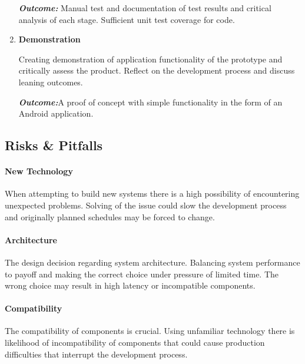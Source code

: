 \documentclass[a4paper, 11pt]{article}
\begin{document}
\begin{enumerate}
\begin{flushleft}
	\emph{\textbf{Outcome:}} Manual test and documentation of test results and critical analysis of each stage. Sufficient unit test coverage for code.
	\vspace{\baselineskip}
  	\end{flushleft}
	   \item \textbf{Demonstration}
   	\begin{flushleft}Creating demonstration of application functionality of the prototype and critically assess the product. Reflect on the development process and discuss leaning outcomes. 
	
	\emph{\textbf{Outcome:}}A proof of concept with simple functionality in the form of an Android application.
	  	\end{flushleft}
\end{enumerate}
\vspace{\baselineskip}


\vspace{\baselineskip}
\vspace{\baselineskip}
\vspace{\baselineskip}

\subsection{Risks \& Pitfalls}
\paragraph{New Technology}When attempting to build new systems there is a high possibility of encountering unexpected problems. Solving of the issue could slow the development process and originally planned schedules may be forced to change. 

\paragraph{Architecture}The design decision regarding system architecture. Balancing system performance to payoff and making the correct choice under pressure of limited time. The wrong choice may result in high latency or incompatible components.   

\paragraph{Compatibility}The compatibility of components is crucial. Using unfamiliar technology there is likelihood of  incompatibility of components that could cause production difficulties that interrupt the development process. 
\end{document}
